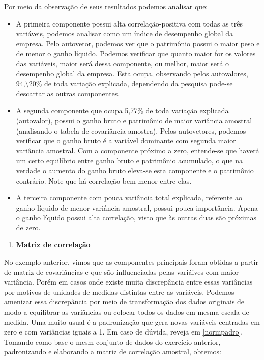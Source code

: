 \documentclass[
  openany]{book}
\providecommand{\tightlist}{%
  \setlength{\itemsep}{0pt}\setlength{\parskip}{0pt}}
\begin{document}
Por meio da observação de seus resultados podemos analisar que:

\begin{itemize}
\item
  A primeira componente possui alta correlação-positiva com todas as três variáveis, podemos analisar como um índice de desempenho global da empresa. Pelo autovetor, podemos ver que o patrimônio possui o maior peso e de menor o ganho líquido. Podemos verificar que quanto maior for os valores das variáveis, maior será dessa componente, ou melhor, maior será o desempenho global da empresa. Esta ocupa, observando pelos autovalores, 94,\textbackslash{}20\% de toda variação explicada, dependendo da pesquisa pode-se descartar as outras componentes.
\item
  A segunda componente que ocupa 5,77\% de toda variação explicada (autovalor), possui o ganho bruto e patrimônio de maior variância amostral (analisando o tabela de covariância amostra). Pelos autovetores, podemos verificar que o ganho bruto é a variável dominante com segunda maior variância amostral. Com a componente próximo a zero, entende-se que haverá um certo equilíbrio entre ganho bruto e patrimônio acumulado, o que na verdade o aumento do ganho bruto eleva-se esta componente e o patrimônio contrário. Note que há correlação bem menor entre elas.
\item
  A terceira componente com pouca variância total explicada, referente ao ganho líquido de menor variância amostral, possui pouca importância. Apena o ganho líquido possui alta correlação, visto que às outras duas são próximas de zero.
\end{itemize}

\begin{enumerate}
\def\labelenumi{\arabic{enumi}.}
\setcounter{enumi}{1}
\tightlist
\item
  \textbf{Matriz de correlação}
\end{enumerate}

No exemplo anterior, vimos que as componentes principais foram obtidas a partir de matriz de covariâncias e que são influenciadas pelas variáives com maior variância. Porém em casos onde existe muita discrepância entre essas variâncias por motivos de unidades de medidas distintas entre as variáveis. Podemos amenizar essa discrepância por meio de transformação dos dados originais de modo a equilibrar as variâncias ou colocar todos os dados em mesma escala de medida. Uma muito usual é a padronização que gera novas variáveis centradas em zero e com variâncias iguais a 1. Em caso de dúvida, reveja em \ref{normpadro}. Tomando como base o mesm conjunto de dados do exercício anterior, padronizando e elaborando a matriz de correlação amostral, obtemos:
\end{document}
